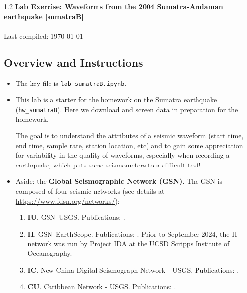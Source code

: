 \documentclass[11pt,titlepage,fleqn]{article}
\newcommand{\tfile}{{\tt lab\_sumatraB.ipynb}}
\begin{document}

\begin{spacing}{1.2} 
\centering
{\large \bf Lab Exercise: Waveforms from the 2004 Sumatra-Andaman earthquake [sumatraB]} \\
\cltag\ \\
Last compiled: \today
\end{spacing}

\subsection*{Overview and Instructions}

\begin{itemize}
\item The key file is \tfile.

\item This lab is a starter for the homework on the Sumatra earthquake (\verb+hw_sumatraB+). Here we download and screen data in preparation for the homework.

The goal is to understand the attributes of a seismic waveform (start time, end time, sample rate, station location, etc) and to gain some appreciation for variability in the quality of waveforms, especially when recording a  earthquake, which puts some seismometers to a difficult test!

\item Aside: the \textbf{Global Seismographic Network (GSN)}. The GSN is composed of four seismic networks (see details at \url{https://www.fdsn.org/networks/}):
%
\begin{enumerate}
\item \textbf{IU}. GSN--USGS. Publications: \citet{OliverMurphy1971,Ringler2020gsn,Wilson2024}.

\item \textbf{II}. GSN--EarthScope. Publications: \citet{Agnew1986,Davis2024}. Prior to September 2024, the II network was run by Project IDA at the UCSD Scripps Institute of Oceanography.

\item \textbf{IC}. New China Digital Seismograph Network - USGS. Publications: \citet{Anderson2015}.

\item \textbf{CU}. Caribbean Network - USGS.  Publications: \citet{Ringler2020gsn,Wilson2024,Wilgus2024}.
\end{enumerate}


\end{itemize}
\end{document}
